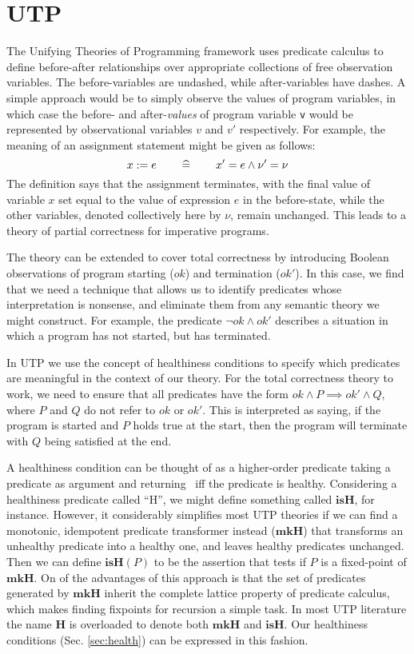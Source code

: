 \section{UTP}\label{sec:UTP}

The Unifying Theories of Programming framework \cite{Hoare-He98}
uses predicate calculus to define before-after relationships
over appropriate collections of free observation variables.
The before-variables are undashed,
while after-variables have dashes.
A simple approach would be to simply observe the values of program variables,
in which case the before- and after-\emph{values}
of program variable \texttt{v}
would be represented by observational variables $v$ and $v'$ respectively.
For example,
the meaning of an assignment statement might be given as follows:
\begin{equation*}
  x := e  \qquad\mathrel{\widehat=}\qquad  x' = e \land \nu'=\nu
\end{equation*}
The definition says that the assignment terminates,
with the final value of variable $x$ set equal
to the value of expression $e$ in the before-state,
while the other variables, denoted collectively here  by $\nu$, remain unchanged.
This leads to a theory of partial correctness for imperative programs.

The theory can be extended to cover total correctness by introducing
Boolean observations of program starting ($ok$) and termination ($ok'$).
In this case, we find that we need a technique that allows us to identify
predicates whose interpretation is nonsense, and eliminate them from any
semantic theory we might construct.
For example, the predicate $\lnot ok \land ok'$ describes a situation
in which a program has not started, but has terminated.

In UTP we use the concept of healthiness conditions to specify which predicates
are meaningful in the context of our theory.
For the total correctness theory to work,
we need to ensure that all predicates have the form
$ok \land P \implies ok' \land Q$, where $P$ and $Q$ do not refer to $ok$ or $ok'$.
This is interpreted as saying,
if the program is started and $P$ holds true at the start,
then the program will terminate with $Q$ being satisfied at the end.

A healthiness condition can be thought of as a higher-order predicate
taking a predicate as argument and returning \true\ iff the predicate is healthy.
Considering a healthiness predicate called ``H'',
we might define something called $\mathbf{isH}$, for instance.
However, it considerably simplifies most UTP theories
if we can find a monotonic, idempotent predicate transformer
instead ($\mathbf{mkH}$)
that transforms an unhealthy predicate into a healthy one,
and leaves healthy predicates unchanged.
Then we can define $\mathbf{isH}(P)$ to be the assertion that tests
if $P$ is a fixed-point of $\mathbf{mkH}$.
On of the advantages of this approach is that the set of predicates
generated by $\mathbf{mkH}$
inherit the complete lattice property of predicate calculus,
which makes finding fixpoints for recursion a simple task.
In most UTP literature the name $\mathbf{H}$ is overloaded
to denote both $\mathbf{mkH}$ and $\mathbf{isH}$.
Our healthiness conditions (Sec. \ref{sec:health})
can be expressed in this fashion.

